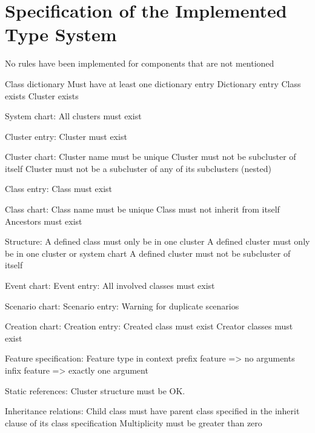 \chapter{Specification of the Implemented Type System}
\label{appendix-type-system}
No rules have been implemented for components that are not mentioned

Class dictionary
	Must have at least one dictionary entry
Dictionary entry
	Class exists
	Cluster exists

System chart:
All clusters must exist

Cluster entry:
	Cluster must exist

Cluster chart:
	Cluster name must be unique
	Cluster must not be subcluster of itself
	Cluster must not be a subcluster of any of its subclusters (nested)
	
Class entry:
	Class must exist

Class chart:
	Class name must be unique
	Class must not inherit from itself
	Ancestors must exist

Structure:
	A defined class must only be in one cluster
	A defined cluster must only be in one cluster or system chart
	A defined cluster must not be subcluster of itself

Event chart:
	Event entry:
		All involved classes must exist

Scenario chart:
	Scenario entry:
		Warning for duplicate scenarios

Creation chart:
	Creation entry:
		Created class must exist
		Creator classes must exist	

Feature specification:
	Feature type in context
	prefix feature => no arguments
	infix feature => exactly one argument

Static references:
	Cluster structure must be OK.

Inheritance relations:
	Child class must have parent class specified in the inherit clause of its class specification
	Multiplicity must be greater than zero